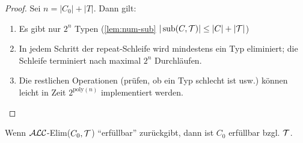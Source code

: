 \begin{proof}
Sei $n = \left| C_{0} \right| + |T|$. Dann gilt:

\begin{enumerate}
\item Es gibt nur $2^{n}$ Typen (\autoref{lem:num-sub} $|\operatorname{sub}(C, \mathcal{T})| \leq |C| + |\mathcal{T}|$)
\item
  In jedem Schritt der repeat-Schleife wird mindestens ein Typ
  eliminiert; die Schleife terminiert nach maximal $2^{n}$
  Durchläufen.
\item
  Die restlichen Operationen (prüfen, ob ein Typ schlecht ist usw.)
  können leicht in Zeit $2^{\text{poly}\left( n \right)}$ implementiert werden.
\end{enumerate}
\end{proof}

\begin{lemma}
    Wenn $\mathcal{A}\mathcal{L}\mathcal{C}$-Elim($C_0,\mathcal{T}$) \enquote{erfüllbar} zurückgibt, dann ist $C_0$ erfüllbar bzgl. $\mathcal{T}$.
\end{lemma}

